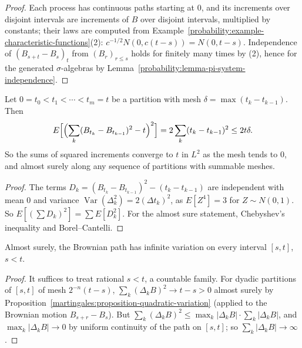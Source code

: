 \begin{proof}
Each process has continuous paths starting at $0$, and its increments over disjoint intervals are increments of $B$ over disjoint intervals, multiplied by constants; their laws are computed from
Example~\ref{probability:example-characteristic-functions}(2): $c^{-1/2}N(0, c(t - s)) = N(0, t - s)$. Independence of $(B_{s+t} - B_s)_t$ from $(B_r)_{r \leq s}$ holds for finitely many times by (2), hence for the generated
$\sigma$-algebras by Lemma~\ref{probability:lemma-pi-system-independence}.
\end{proof}

\begin{proposition}\label{martingales:proposition-quadratic-variation}
Let $0 = t_0 < t_1 < \cdots < t_m = t$ be a partition with mesh $\delta = \max(t_k - t_{k-1})$. Then
\[
E\Bigl[\Bigl(\sum_k(B_{t_k} - B_{t_{k-1}})^2 - t\Bigr)^2\Bigr] = 2\sum_k(t_k - t_{k-1})^2 \leq 2t\delta.
\]
So the sums of squared increments converge to $t$ in $L^2$ as the mesh tends to $0$, and almost surely along any sequence of partitions with summable meshes.
\end{proposition}

\begin{proof}
The terms $D_k = (B_{t_k} - B_{t_{k-1}})^2 - (t_k - t_{k-1})$ are independent with mean $0$ and variance $\operatorname{Var}(\Delta_k^2) = 2(\Delta t_k)^2$, as $E[Z^4] = 3$ for $Z \sim N(0, 1)$. So $E[(\sum D_k)^2] = \sum E[D_k^2]$. For the almost sure
statement, Chebyshev's inequality and Borel--Cantelli.
\end{proof}

\begin{corollary}\label{martingales:corollary-unbounded-variation}
Almost surely, the Brownian path has infinite variation on every interval $[s, t]$, $s < t$.
\end{corollary}

\begin{proof}
It suffices to treat rational $s < t$, a countable family. For dyadic partitions of $[s, t]$ of mesh $2^{-n}(t - s)$, $\sum_k(\Delta_kB)^2 \to t - s > 0$ almost surely by Proposition~\ref{martingales:proposition-quadratic-variation} (applied to the
Brownian motion $B_{s+r} - B_s$). But $\sum_k(\Delta_kB)^2 \leq \max_k|\Delta_kB|\cdot\sum_k|\Delta_kB|$, and $\max_k|\Delta_kB| \to 0$ by uniform continuity of the path on $[s, t]$; so $\sum_k|\Delta_kB| \to \infty$.
\end{proof}

